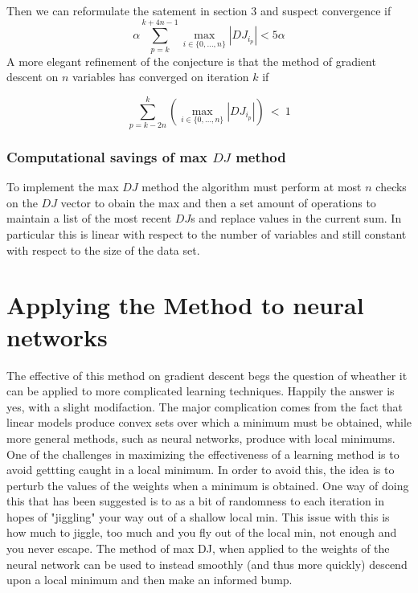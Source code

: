 \documentclass[11pt]{article} %
\begin{document}
Then we can reformulate the satement in section 3 and suspect convergence if 
$$\alpha \sum_{p=k}^{k+4n-1} \max_{i \in \{0, \dots , n\}} |DJ_{i_{p}}| < 5\alpha$$
 A more elegant refinement of the conjecture is that the method of gradient descent on $n$ variables has converged on iteration $k$ if 

$$\sum_{p=k-2n}^{k} \left( \max_{i \in \{0, \dots , n\}} |DJ_{i_{p}}| \right)\  <\ 1 $$  

\subsubsection{Computational savings of max $DJ$ method}
To implement the max $DJ$ method the algorithm must perform at most $n$ checks on the $DJ$ vector to obain the max and then a set amount of operations to maintain a list of the most recent $DJ$s and replace values in the current sum.  In particular this is linear with respect to the number of variables and still constant with respect to the size of the data set. 

\section{Applying the Method to neural networks} 
The effective of this method on gradient descent begs the question of wheather it can be applied to more complicated learning techniques. Happily the answer is yes, with a slight modifaction.  The major complication comes from the fact that linear models produce convex sets over which a minimum must be obtained, while more general methods, such as neural networks, produce with local minimums.  One of the challenges in maximizing the effectiveness of a learning method is to avoid gettting caught in a local minimum. In order to avoid this, the idea is to perturb the values of the weights when a minimum is obtained. One way of doing this that has been suggested is to as a bit of randomness to each iteration in hopes of "jiggling" your way out of a shallow local min.  This issue with this is how much to jiggle, too much and you fly out of the local min, not enough and you never escape.  The method of max DJ, when applied to the weights of the neural network can be used to instead smoothly (and thus more quickly) descend upon a local minimum and then make an informed bump. 
\end{document}
